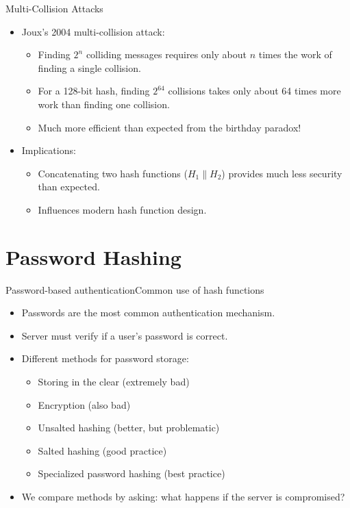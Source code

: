 \documentclass[aspectratio=169, lualatex, handout]{beamer}
\begin{document}
\begin{frame}{Multi-Collision Attacks}
	\begin{itemize}[<+->]
		\item Joux's 2004 multi-collision attack:
		      \begin{itemize}
			      \item Finding $2^n$ colliding messages requires only about $n$ times the work of finding a single collision.
			      \item For a 128-bit hash, finding $2^{64}$ collisions takes only about 64 times more work than finding one collision.
			      \item Much more efficient than expected from the birthday paradox!
		      \end{itemize}
		\item Implications:
		      \begin{itemize}
			      \item Concatenating two hash functions ($H_1 \| H_2$) provides much less security than expected.
			      \item Influences modern hash function design.
		      \end{itemize}
	\end{itemize}
\end{frame}

\section{Password Hashing}

\begin{frame}{Password-based authentication}{Common use of hash functions}
	\begin{itemize}[<+->]
		\item Passwords are the most common authentication mechanism.
		\item Server must verify if a user's password is correct.
		\item Different methods for password storage:
		      \begin{itemize}[<+->]
			      \item Storing in the clear (extremely bad)
			      \item Encryption (also bad)
			      \item Unsalted hashing (better, but problematic)
			      \item Salted hashing (good practice)
			      \item Specialized password hashing (best practice)
		      \end{itemize}
		\item We compare methods by asking: what happens if the server is compromised?
	\end{itemize}
\end{frame}
\end{document}
